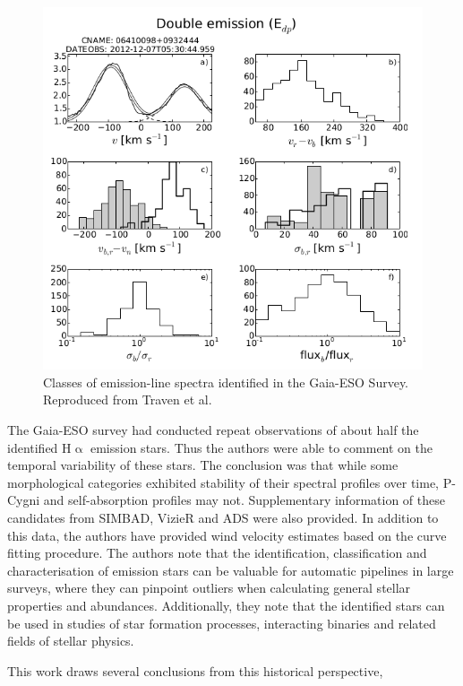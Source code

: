 \begin{figure}[!htb]
\centering
\includegraphics[scale=.50]{figures/gaia eso2.png}
\caption{Classes of emission-line spectra identified in the Gaia-ESO Survey. Reproduced from Traven et al.}
\end{figure}

The Gaia-ESO survey had conducted repeat observations of about half the identified H$\upalpha$ emission stars. Thus the authors were able to comment on the temporal variability of these stars. The conclusion was that while some morphological categories exhibited stability of their spectral profiles over time, P-Cygni and self-absorption profiles may not. Supplementary information of these candidates from SIMBAD, VizieR and ADS were also provided. In addition to this data, the authors have provided wind velocity estimates based on the curve fitting procedure. The authors note that the identification, classification and characterisation of emission stars can be valuable for automatic pipelines in large surveys, where they can pinpoint outliers when calculating general stellar properties and abundances. Additionally, they note that the identified stars can be used in studies of star formation processes, interacting binaries and related fields of stellar physics. 

This work draws several conclusions from this historical perspective,

